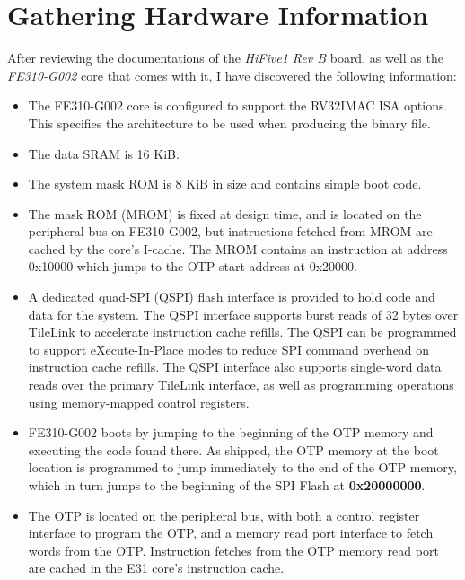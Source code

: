 \documentclass[a4paper,12pt,twoside]{report}
\begin{document}
            \section{Gathering Hardware Information}
            After reviewing the documentations of the \textit{HiFive1 Rev B} board, as well as the \textit{FE310-G002} core that comes with it, I have discovered the following information:
            \begin{itemize}
            	\item The FE310-G002 core is configured to support the RV32IMAC ISA options. This specifies the architecture to be used when producing the binary file.\cite{hifive1RevBConfig}

				\item The data SRAM is 16 KiB.\cite{hifive1RevBConfig}

            	\item The system mask ROM is 8 KiB in size and contains simple boot code.\cite{hifive1RevBConfig}

                \item The mask ROM (MROM) is fixed at design time, and is located on the peripheral bus on FE310-G002, but instructions fetched from MROM are cached by the core’s I-cache. The MROM contains an instruction at address 0x10000 which jumps to the OTP start address at 0x20000.\cite{fe310g002manBootProcess}

                \item A dedicated quad-SPI (QSPI) flash interface is provided to hold code and data for the system. The QSPI interface supports burst reads of 32 bytes over TileLink to accelerate instruction cache refills. The QSPI can be programmed to support eXecute-In-Place modes to reduce SPI command overhead on instruction cache refills. The QSPI interface also supports single-word data reads over the primary TileLink interface, as well as programming operations using memory-mapped control registers.\cite{hifive1RevBConfig}

            	\item FE310-G002 boots by jumping to the beginning of the OTP memory and executing the code found there. As shipped, the OTP memory at the boot location is programmed to jump immediately to the end of the OTP memory, which in turn jumps to the beginning of the SPI Flash at \textbf{0x20000000}.\cite{hifive1RevBBootCode}

                \item The OTP is located on the peripheral bus, with both a control register interface to program the OTP, and a memory read port interface to fetch words from the OTP. Instruction fetches from the OTP memory read port are cached in the E31 core’s instruction cache.\cite{fe310g002manBootProcess}


\end{itemize}
\end{document}
